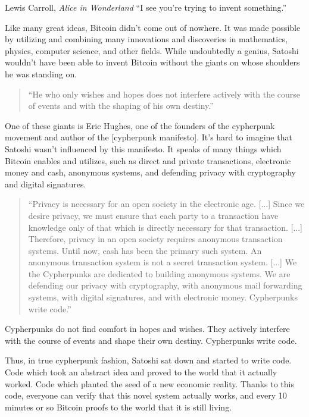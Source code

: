 \label{les:20}

\begin{chapquote}{Lewis Carroll, \textit{Alice in Wonderland}}
``I see you're trying to invent something.''
\end{chapquote}

Like many great ideas, Bitcoin didn't come out of nowhere. It was made
possible by utilizing and combining many innovations and discoveries in
mathematics, physics, computer science, and other fields. While
undoubtedly a genius, Satoshi wouldn't have been able to invent Bitcoin
without the giants on whose shoulders he was standing on.

\begin{quotation}
``He who only wishes and hopes does not interfere actively with the
course of events and with the shaping of his own destiny.''
\end{quotation}

One of these giants is Eric Hughes, one of the founders of the
cypherpunk movement and author of the [cypherpunk manifesto]. It's hard
to imagine that Satoshi wasn't influenced by this manifesto. It speaks
of many things which Bitcoin enables and utilizes, such as direct and
private transactions, electronic money and cash, anonymous systems, and
defending privacy with cryptography and digital signatures.

\begin{quotation}
``Privacy is necessary for an open society in the electronic age.
[...] Since we desire privacy, we must ensure that each party to a
transaction have knowledge only of that which is directly necessary
for that transaction. [...]
Therefore, privacy in an open society requires anonymous transaction
systems. Until now, cash has been the primary such system. An
anonymous transaction system is not a secret transaction system.
[...]
We the Cypherpunks are dedicated to building anonymous systems. We are
defending our privacy with cryptography, with anonymous mail
forwarding systems, with digital signatures, and with electronic
money.
Cypherpunks write code.''
\end{quotation}

Cypherpunks do not find comfort in hopes and wishes. They actively
interfere with the course of events and shape their own destiny.
Cypherpunks write code.

Thus, in true cypherpunk fashion, Satoshi sat down and started to write
code. Code which took an abstract idea and proved to the world that it
actually worked. Code which planted the seed of a new economic reality.
Thanks to this code, everyone can verify that this novel system actually
works, and every 10 minutes or so Bitcoin proofs to the world that it is
still living.

